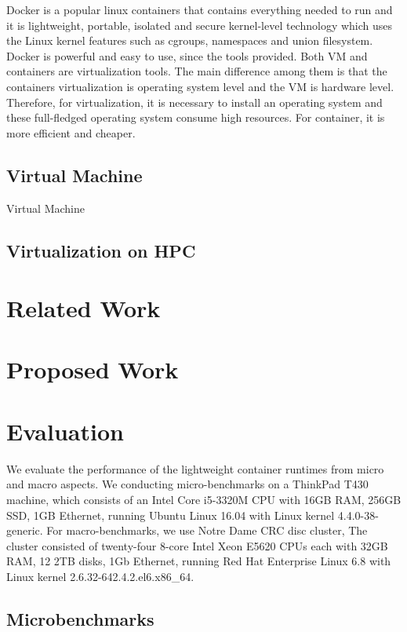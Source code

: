 \documentclass{article}
\begin{document}
Docker\cite{dockerwb} is a popular linux containers that contains everything needed to run and it is lightweight, portable, isolated and secure kernel-level technology\cite{merkel2014docker} which uses the Linux kernel features such as cgroups, namespaces and union filesystem. Docker is powerful and easy to use, since the tools provided. Both VM and containers are virtualization tools. The main difference\cite{merkel2014docker} among them is that the containers virtualization is operating system level and the VM is hardware level. Therefore, for virtualization, it is necessary to install an operating system and these full-fledged operating system consume high resources. For container, it is more efficient and cheaper. 

\subsection{Virtual Machine}

Virtual Machine\cite{rosenblum2005virtual}

\subsection{Virtualization on HPC}

\section{Related Work}

\section{Proposed Work}

\section{Evaluation}

We evaluate the performance of the lightweight container runtimes from micro and macro aspects. We conducting 
micro-benchmarks on a ThinkPad T430 machine, which consists of an Intel Core i5-3320M CPU with 16GB RAM, 256GB
SSD, 1GB Ethernet, running Ubuntu Linux 16.04 with Linux kernel 4.4.0-38-generic. For macro-benchmarks, we use
Notre Dame CRC disc cluster, The cluster consisted of twenty-four 8-core Intel Xeon E5620 CPUs each with 32GB
RAM, 12 2TB disks, 1Gb Ethernet, running Red Hat Enterprise Linux 6.8 with Linux kernel 2.6.32-642.4.2.el6.x86\_64.

\subsection{Microbenchmarks}
\end{document}
